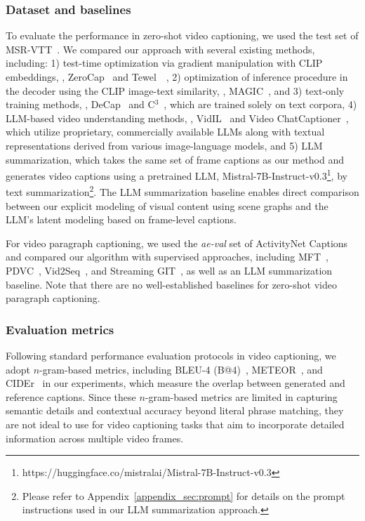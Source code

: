 \subsubsection{Dataset and baselines}
To evaluate the performance in zero-shot video captioning, we used the test set of MSR-VTT~\cite{xu2016msr-vtt}. 
We compared our approach with several existing methods, including:
1) test-time optimization via gradient manipulation with CLIP embeddings, \eg, ZeroCap~\cite{tewel2021zero} and Tewel~\etal~\cite{Tewel_2023_BMVC}, 2) optimization of inference procedure in the decoder using the CLIP image-text similarity, \eg, MAGIC~\cite{su2022language}, and 3) text-only training methods, \eg, DeCap~\cite{lidecap} and C$^{3}$~\cite{zhang2024connect}, which are trained solely on text corpora, 4) LLM-based video understanding methods, \eg, VidIL~\cite{wang2022language} and Video ChatCaptioner~\cite{chen2023video}, which utilize proprietary, commercially available LLMs along with textual representations derived from various image-language models, and 5) LLM summarization, which takes the same set of frame captions as our method and generates video captions using a pretrained LLM, Mistral-7B-Instruct-v0.3\footnote{https://huggingface.co/mistralai/Mistral-7B-Instruct-v0.3}, by text summarization\footnote{Please refer to Appendix~\ref{appendix_sec:prompt} for details on the prompt instructions used in our LLM summarization approach.}.
The LLM summarization baseline enables direct comparison between our explicit modeling of visual content using scene graphs and the LLM's latent modeling based on frame-level captions.

For video paragraph captioning, we used the \textit{ae-val} set of ActivityNet Captions~\cite{krishna2017dense} and compared our algorithm with supervised approaches, including MFT~\cite{xiong2018move}, PDVC~\cite{wang2021end}, Vid2Seq~\cite{yang2023vid2seq}, and Streaming GIT~\cite{zhou2024streaming}, as well as an LLM summarization baseline.
Note that there are no well-established baselines for zero-shot video paragraph captioning.

\subsubsection{Evaluation metrics}

Following standard performance evaluation protocols in video captioning, we adopt $n$-gram-based metrics, including BLEU-4 (B@4)~\cite{papineni2002bleu}, METEOR~\cite{banerjee2005meteor}, and CIDEr~\cite{vedantam2015cider} in our experiments, which measure the overlap between generated and reference captions.
Since these $n$-gram-based metrics are limited in capturing semantic details and contextual accuracy beyond literal phrase matching, they are not ideal to use for video captioning tasks that aim to incorporate detailed information across multiple video frames.

